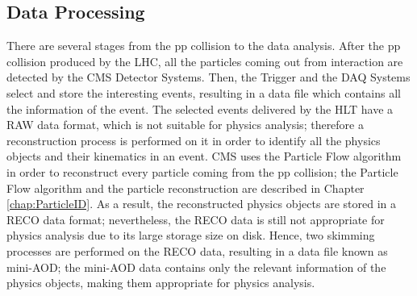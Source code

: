 \subsection{Data Processing}
\noindent There are several stages from the pp collision to the data analysis. 
After the pp collision produced by the LHC, all the particles coming out from interaction
are detected by the CMS Detector Systems. Then, the Trigger and the DAQ Systems select and 
store the interesting events, resulting in a data file which contains all the information of 
the event. The selected events delivered by the HLT have a RAW data format, which is not
suitable for physics analysis; therefore a reconstruction process is performed on it in 
order to identify all the physics objects and their kinematics in an event. CMS uses 
the Particle Flow algorithm in order to reconstruct every particle coming from the pp collision; the 
Particle Flow algorithm and the particle reconstruction are described 
in Chapter \ref{chap:ParticleID}. As a result, the reconstructed physics objects are stored in a RECO data 
format; nevertheless, the RECO data is still not appropriate for physics analysis due to its large 
storage size on disk. Hence, two skimming processes are performed on the RECO data, resulting in 
a data file known as mini-AOD; the mini-AOD data contains only the relevant information 
of the physics objects, making them appropriate for physics analysis.\\













